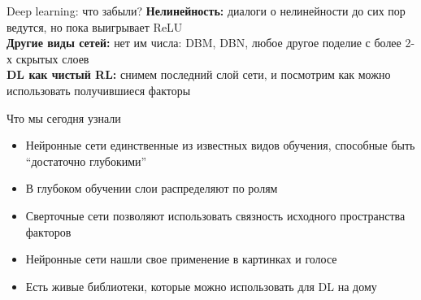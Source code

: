 \documentclass[14pt, fleqn, xcolor={dvipsnames, table}]{beamer}
\begin{document}
\begin{frame}{Deep learning: что забыли?}
\textbf{\color{blue}Нелинейность:} диалоги о нелинейности до сих пор ведутся, но пока выигрывает ReLU \\
\textbf{\color{blue}Другие виды сетей:} нет им числа: DBM, DBN, любое другое поделие с более 2-х скрытых слоев \\
\textbf{\color{blue}DL как чистый RL:} снимем последний слой сети, и посмотрим как можно использовать получившиеся факторы
\end{frame}

\begin{frame}{Что мы сегодня узнали}
\begin{itemize}
  \item Нейронные сети единственные из известных видов обучения, способные быть ``достаточно глубокими''
  \item В глубоком обучении слои распределяют по ролям
  \item Сверточные сети позволяют использовать связность исходного пространства факторов
  \item Нейронные сети нашли свое применение в картинках и голосе
  \item Есть живые библиотеки, которые можно использовать для DL на дому
\end{itemize}
\end{frame}
\end{document}
